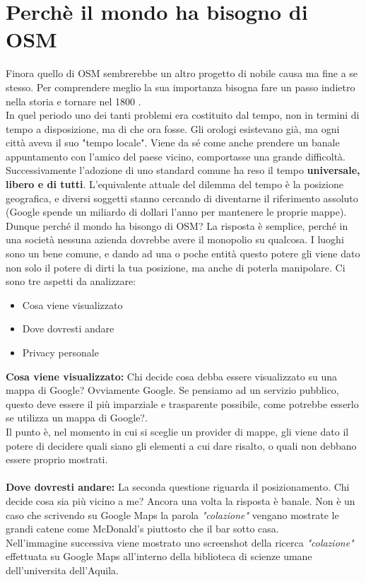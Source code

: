 \newpage 
\section{Perchè il mondo ha bisogno di OSM} 

Finora quello di OSM sembrerebbe un altro progetto di nobile causa ma fine a se stesso. Per comprendere meglio la sua importanza bisogna fare un passo indietro nella storia e tornare nel 1800 \cite{WHYNEED} .\\
In quel periodo uno dei tanti problemi era costituito dal tempo, non in termini di tempo a disposizione, ma di che ora fosse. Gli orologi esistevano già, ma ogni città aveva il suo "tempo locale". Viene da sé come anche prendere un banale appuntamento con l'amico del paese vicino, comportasse una grande difficoltà. Successivamente l'adozione di uno standard comune ha reso il tempo \textbf{universale, libero e di tutti}.
L'equivalente attuale del dilemma del tempo è la posizione geografica, e diversi soggetti stanno cercando di diventarne il riferimento assoluto (Google spende un miliardo di dollari l'anno per mantenere le proprie mappe). 
Dunque perché il mondo ha bisongo di OSM? La risposta è semplice, perché in una società nessuna azienda dovrebbe avere il monopolio su qualcosa. I luoghi sono un bene comune, e dando ad una o poche entità questo potere gli viene dato non solo il potere di dirti la tua posizione, ma anche di poterla manipolare.
Ci sono tre aspetti da analizzare:
\begin{itemize}
\item Cosa viene visualizzato
\item Dove dovresti andare
\item Privacy personale\\
\end{itemize} 

\textbf{Cosa viene visualizzato:} Chi decide cosa debba essere visualizzato su una mappa di Google? Ovviamente Google. Se pensiamo ad un servizio pubblico, questo deve essere il più imparziale e trasparente possibile, come potrebbe esserlo se utilizza un mappa di Google?.\\
Il punto è, nel momento in cui si sceglie un provider di mappe, gli viene dato il potere di decidere quali siano gli elementi a cui dare risalto, o quali non debbano essere proprio mostrati.\\\\
\textbf{Dove dovresti andare:} La seconda questione riguarda il posizionamento. Chi decide cosa sia più vicino a me? Ancora una volta la risposta è banale. Non è un caso che scrivendo su Google Maps la parola \textit{"colazione"} vengano mostrate le grandi catene come McDonald's piuttosto che il bar sotto casa.\\
Nell'immagine successiva viene mostrato uno screenshot della ricerca \textit{"colazione"} effettuata su Google Maps all'interno della biblioteca di scienze umane dell'universita dell'Aquila. 

